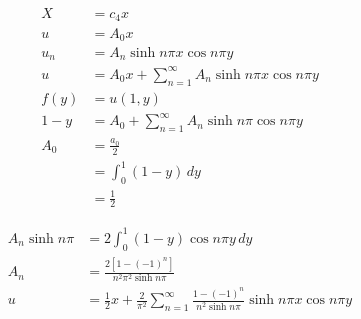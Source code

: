 \documentclass{article}
\begin{document}
\begin{align*}
  X               & = c_4 x                                                      \\
  u               & = A_0 x                                                      \\
  u_n             & = A_n \sinh n \pi x \cos n \pi y                             \\
  u               & = A_0 x + \sum_{n = 1}^\infty A_n \sinh n \pi x \cos n \pi y \\
  f(y)            & = u(1, y)                                                    \\
  1 - y           & = A_0 + \sum_{n = 1}^\infty A_n \sinh n \pi \cos n \pi y     \\
  A_0             & = \frac{a_0}{2}                                              \\
                  & = \int_0^1 (1 - y) \,d y                                     \\
                  & = \frac{1}{2}
\end{align*}

\begin{align*}
  A_n \sinh n \pi & = 2 \int_0^1 (1 - y) \cos n \pi y \,d y                                                                             \\
  A_n             & = \frac{2 [1 - (-1)^n]}{n^2 \pi^2 \sinh n \pi}                                                                      \\
  u               & = \frac{1}{2} x + \frac{2}{\pi^2} \sum_{n = 1}^\infty \frac{1 - (-1)^n}{n^2 \sinh n \pi} \sinh n \pi x \cos n \pi y
\end{align*}

\setcounter{subsubsection}{6}
\subsubsection{}
\end{document}
